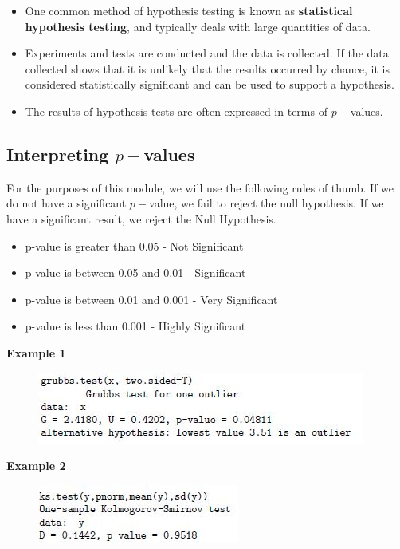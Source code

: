 \documentclass[12pt, a4paper]{article}
\begin{document}
\begin{itemize}
\item One common method of hypothesis testing is known as \textbf{statistical hypothesis testing}, and typically deals with large quantities of data. 
\item Experiments and tests are conducted and the data is collected. If the data collected shows that it is unlikely that the results occurred by chance, it is considered statistically significant and can be used to support a hypothesis.
\item The results of hypothesis tests are often expressed in terms of $p-$values.
\end{itemize}
\newpage

\subsection*{Interpreting $p-$values}

For the purposes of this module, we will use the following rules of thumb.
If we do not have a significant $p-$value, we fail to reject the null hypothesis.
If we have a significant result, we reject the Null Hypothesis.
\begin{itemize}
	\item p-value is greater than 0.05 - Not Significant
	\item p-value is between 0.05 and 0.01 - Significant
	\item p-value is between 0.01 and 0.001 - Very Significant
	\item p-value is less than 0.001 - Highly Significant
\end{itemize}
\newpage


\noindent \textbf{Example 1}
\begin{figure}[h!]
\centering
\includegraphics[width=0.9\linewidth]{gruubsTest}
\caption{}
\label{fig:gruubsTest}
\end{figure}

\bigskip
\noindent \textbf{Example 2}
\begin{figure}[h!]
\centering
\includegraphics[width=0.6\linewidth]{kstest}
\caption{}
\label{fig:kstest}
\end{figure}
\end{document}
